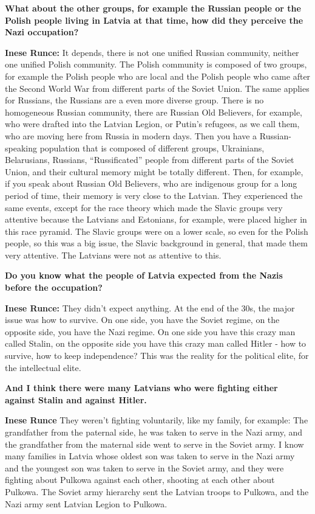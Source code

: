\textbf{What about the other groups, for example the Russian people or the Polish people living in Latvia at that time, how did they perceive the Nazi occupation?}

\textbf{Inese Runce:} It depends, there is not one unified Russian community, neither one unified Polish community. The Polish community is composed of two groups, for example the Polish people who are local and the Polish people who came after the Second World War from different parts of the Soviet Union. The same applies for Russians, the Russians are a even more diverse group. There is no homogeneous Russian community, there are Russian Old Believers, for example, who were drafted into the Latvian Legion, or Putin's refugees, as we call them, who are moving here from Russia in modern days. Then you have a Russian-speaking population that is composed of different groups, Ukrainians, Belarusians, Russians, ``Russificated'' people from different parts of the Soviet Union, and their cultural memory might be totally different. Then, for example, if you speak about Russian Old Believers, who are indigenous group for a long period of time, their memory is very close to the Latvian. They experienced the same events, except for the race theory which made the Slavic groups very attentive because the Latvians and Estonians, for example, were placed higher in this race pyramid. The Slavic groups were on a lower scale, so even for the Polish people, so this was a big issue, the Slavic background in general, that made them very attentive. The Latvians were not as attentive to this.

\textbf{Do you know what the people of Latvia expected from the Nazis before the occupation?}

\textbf{Inese Runce:} They didn't expect anything. At the end of the 30s, the major issue was how to survive. On one side, you have the Soviet regime, on the opposite side, you have the Nazi regime. On one side you have this crazy man called Stalin, on the opposite side you have this crazy man called Hitler - how to survive, how to keep independence?  This was the reality for the political elite, for the intellectual elite. 

\textbf{And I think there were many Latvians who were fighting either against Stalin and against Hitler.} 

\textbf{Inese Runce} They weren't fighting voluntarily, like my family, for example: The grandfather from the paternal side, he was taken to serve in the Nazi army, and the grandfather from the maternal side went to serve in the Soviet army. I know many families in Latvia whose oldest son was taken to serve in the Nazi army and the youngest son was taken to serve in the Soviet army, and they were fighting about Pulkowa against each other, shooting at each other about Pulkowa. The Soviet army hierarchy sent the Latvian troops to Pulkowa, and the Nazi army sent Latvian Legion to Pulkowa.

